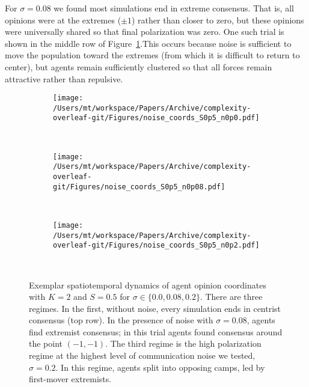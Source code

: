 For $\sigma=0.08$ we found most simulations end in extreme consensus. That is, all opinions were at the extremes ($\pm 1$) rather than closer to zero, but these opinions were universally shared so that final polarization was zero. One such trial is shown in the middle row of Figure~\ref{fig:noiseCoordsS0p5}.This occurs because noise is sufficient to move the population toward the extremes (from which it is  difficult to return to center), but agents remain sufficiently clustered so that all forces remain attractive rather than repulsive. 




\begin{figure}[H]
  \centering
    \begin{subfigure}[t]{\textwidth}
      \centering
      \texttt{[image: /Users/mt/workspace/Papers/Archive/complexity-overleaf-git/Figures/noise\_coords\_S0p5\_n0p0.pdf]}
    \end{subfigure} \\
    \begin{subfigure}[t]{\textwidth}
      \centering
      \texttt{[image: /Users/mt/workspace/Papers/Archive/complexity-overleaf-git/Figures/noise\_coords\_S0p5\_n0p08.pdf]}
    \end{subfigure} \\
    \begin{subfigure}[t]{\textwidth}
      \centering
      \texttt{[image: /Users/mt/workspace/Papers/Archive/complexity-overleaf-git/Figures/noise\_coords\_S0p5\_n0p2.pdf]}
    \end{subfigure} \\
  \caption{Exemplar spatiotemporal dynamics of agent opinion coordinates with $K=2$ and 
    $S=0.5$ for $\sigma \in \{0.0,0.08,0.2\}$. There are three regimes. In the first, without
    noise, every simulation 
    ends in centrist consensus (top row). In the presence of noise with $\sigma=0.08$,
    agents find extremist consensus; in this trial agents found consensus around the point $(-1, -1)$.
    The third regime is the high polarization regime at the highest level of communication noise
    we tested, $\sigma=0.2$. In this regime, agents split into 
    opposing camps, led by first-mover extremists.
  }
  \label{fig:noiseCoordsS0p5}
\end{figure}


